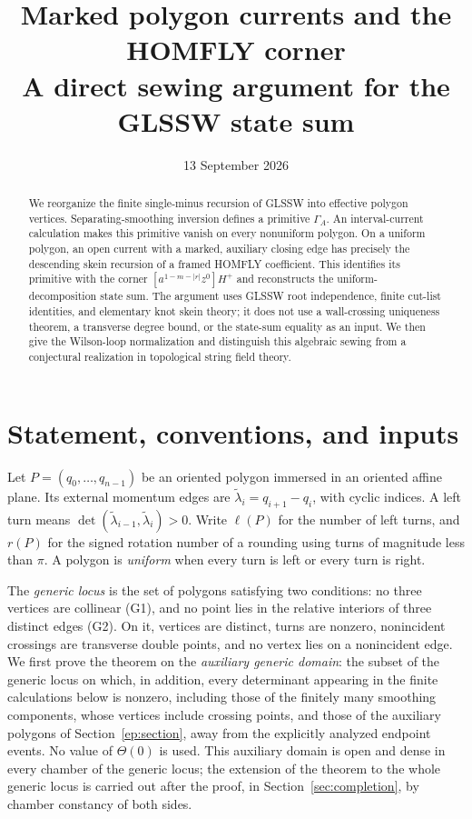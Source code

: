 \documentclass[11pt,letterpaper]{article}
\title{Marked polygon currents and the HOMFLY corner\\
\large A direct sewing argument for the GLSSW state sum}
\author{}
\date{13 September 2026}
\numberwithin{equation}{section}
\theoremstyle{definition}
\theoremstyle{remark}
\begin{document}
\maketitle
\begin{abstract}
We reorganize the finite single-minus recursion of GLSSW into effective
polygon vertices. Separating-smoothing inversion defines a primitive
\(\Gamma_A\). An interval-current calculation makes this primitive vanish
on every nonuniform polygon. On a uniform polygon, an open current with a
marked, auxiliary closing edge has precisely the descending skein recursion
of a framed HOMFLY coefficient. This identifies its primitive with the
corner \([a^{1-m-|r|}z^0]H^+\) and reconstructs the uniform-decomposition
state sum. The argument uses GLSSW root independence, finite cut-list
identities, and elementary knot skein theory; it does not use a
wall-crossing uniqueness theorem, a transverse degree bound, or the
state-sum equality as an input. We then give the Wilson-loop normalization
and distinguish this algebraic sewing from a conjectural realization in
topological string field theory.
\end{abstract}
{\footnotesize\tableofcontents}
\clearpage

\section{Statement, conventions, and inputs}
\label{sec:statement}

Let \(P=(q_0,\ldots,q_{n-1})\) be an oriented polygon immersed in an
oriented affine plane. Its external momentum edges are
\(\widetilde\lambda_i=q_{i+1}-q_i\), with cyclic indices. A left turn means
\(\det(\widetilde\lambda_{i-1},\widetilde\lambda_i)>0\).
Write \(\ell(P)\) for the number of left turns, and \(r(P)\) for the signed
rotation number of a rounding using turns of magnitude less than \(\pi\).
A polygon is \emph{uniform} when every turn is left or every turn is right.

The \emph{generic locus} is the set of polygons satisfying two
conditions: no three vertices are collinear (G1), and no point lies in
the relative interiors of three distinct edges (G2). On it, vertices are distinct, turns are nonzero,
nonincident crossings are transverse double points, and no vertex lies on
a nonincident edge. We first prove the theorem on the \emph{auxiliary
generic domain}: the subset of the generic locus on which, in addition,
every determinant appearing in the finite calculations below is nonzero,
including those of the finitely many smoothing components, whose vertices
include crossing points, and those of the auxiliary polygons of
Section~\ref{ep:section}, away from the explicitly analyzed endpoint
events. No value of \(\Theta(0)\) is used. This auxiliary domain is open
and dense in every chamber of the generic locus; the extension of the
theorem to the whole generic locus is carried out after the proof, in
Section~\ref{sec:completion}, by chamber constancy of both sides.
\end{document}
